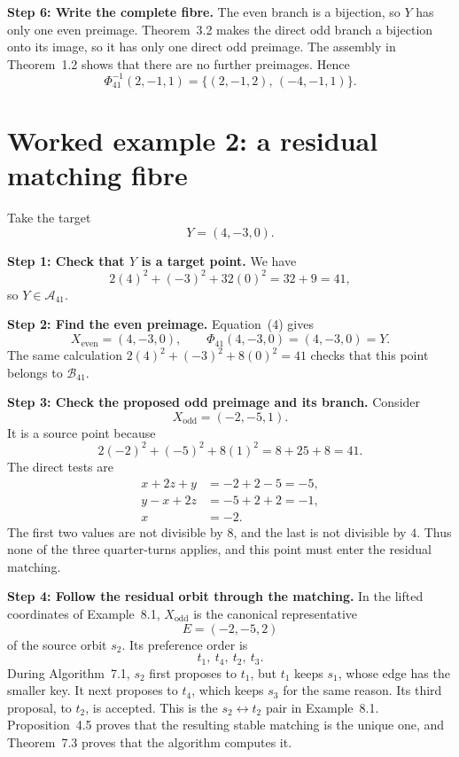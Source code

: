 \documentclass[11pt]{amsart}
\newcommand{\B}{\mathcal B_{41}}
\newcommand{\A}{\mathcal A_{41}}
\newcommand{\PhiMap}{\Phi_{41}}
\begin{document}
\medskip
\noindent\textbf{Step 6: Write the complete fibre.}
The even branch is a bijection, so \(Y\) has only one even preimage.
Theorem~3.2 makes the direct odd branch a bijection onto its image, so it has
only one direct odd preimage.  The assembly in Theorem~1.2 shows that there
are no further preimages.  Hence
\[
 \boxed{\PhiMap^{-1}(2,-1,1)
 =\{(2,-1,2),\,(-4,-1,1)\}.}
\]

\newpage
\section*{Worked example 2: a residual matching fibre}

Take the target
\[
 Y=(4,-3,0).
\]

\noindent\textbf{Step 1: Check that \(Y\) is a target point.}
We have
\[
 2(4)^2+(-3)^2+32(0)^2=32+9=41,
\]
so \(Y\in\A\).

\medskip
\noindent\textbf{Step 2: Find the even preimage.}
Equation~(4) gives
\[
 X_{\mathrm{even}}=(4,-3,0),
 \qquad
 \PhiMap(4,-3,0)=(4,-3,0)=Y.
\]
The same calculation \(2(4)^2+(-3)^2+8(0)^2=41\) checks that this point
belongs to \(\B\).

\medskip
\noindent\textbf{Step 3: Check the proposed odd preimage and its branch.}
Consider
\[
 X_{\mathrm{odd}}=(-2,-5,1).
\]
It is a source point because
\[
 2(-2)^2+(-5)^2+8(1)^2=8+25+8=41.
\]
The direct tests are
\[
\begin{aligned}
 x+2z+y&=-2+2-5=-5,\\
 y-x+2z&=-5+2+2=-1,\\
 x&=-2.
\end{aligned}
\]
The first two values are not divisible by \(8\), and the last is not
divisible by \(4\).  Thus none of the three quarter-turns applies, and this
point must enter the residual matching.

\medskip
\noindent\textbf{Step 4: Follow the residual orbit through the matching.}
In the lifted coordinates of Example~8.1, \(X_{\mathrm{odd}}\) is the
canonical representative
\[
 E=(-2,-5,2)
\]
of the source orbit \(s_2\).  Its preference order is
\[
 t_1,\ t_4,\ t_2,\ t_3.
\]
During Algorithm~7.1, \(s_2\) first proposes to \(t_1\), but \(t_1\) keeps
\(s_1\), whose edge has the smaller key.  It next proposes to \(t_4\), which
keeps \(s_3\) for the same reason.  Its third proposal, to \(t_2\), is
accepted.  This is the \(s_2\leftrightarrow t_2\) pair in Example~8.1.
Proposition~4.5 proves that the resulting stable matching is the unique one,
and Theorem~7.3 proves that the algorithm computes it.
\end{document}
